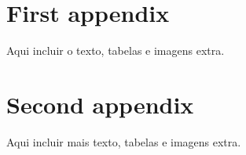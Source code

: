 \chapter{First appendix}
Aqui incluir o texto, tabelas e imagens extra.

\chapter{Second appendix}
Aqui incluir mais texto, tabelas e imagens extra.
